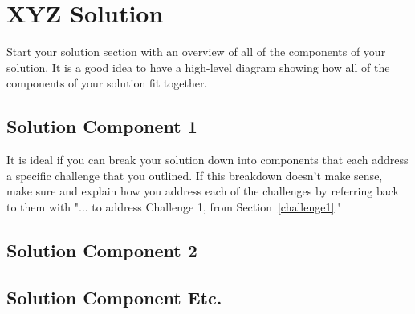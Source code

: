 \section{XYZ Solution}
\label{solution}

Start your solution section with an overview of all
of the components of your solution. It is a good idea
to have a high-level diagram showing how all of the
components of your solution fit together.

\subsection{Solution Component 1}
\label{solutionpart1}

It is ideal if you can break your solution down
into components that each address a specific
challenge that you outlined. If this breakdown
doesn't make sense, make sure and explain how
you address each of the challenges by referring
back to them with "... to address Challenge 1, from
Section~\ref{challenge1}."

\subsection{Solution Component 2}
\label{solutionpart2}


\subsection{Solution Component Etc.}
\label{solutionpartetc}